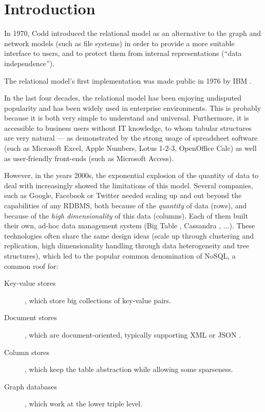 \documentclass{vldb}
\begin{document}
\section{Introduction}
In 1970, Codd \cite{Codd1970} introduced the relational model as an alternative to the graph and network models (such as file systems) in order to provide a more suitable interface to users, and to protect them from internal representations (``data independence'').

The relational model's first implementation was made public in 1976 by IBM \cite{Astrahan1976}.

In the last four decades, the relational model has been enjoying undisputed popularity and has been widely used in enterprise environments. This is probably because it is both very simple to understand and universal. Furthermore, it is accessible to business users without IT knowledge, to whom tabular structures are very natural --- as demonstrated by the strong usage of spreadsheet software \cite{Mattessich1958} \cite{Mattessich1961} (such as Microsoft Excel, Apple Numbers, Lotus 1-2-3, OpenOffice Calc) as well as user-friendly front-ends (such as Microsoft Access).

However, in the years 2000s, the exponential explosion of the quantity of data to deal with increasingly showed the limitations of this model. Several companies, such as Google, Facebook or Twitter needed scaling up and out beyond the capabilities of any RDBMS, both because of the \emph{quantity} of data (rows), and because of the \emph{high dimensionality} of this data (columns). Each of them built their own, ad-hoc data management system (Big Table \cite{Chang2008}, Cassandra \cite{Lakshman2010}, ...). These technologies often share the same design ideas (scale up through clustering and replication, high dimensionality handling through data heterogeneity and tree structures), which led to the popular common denomination of NoSQL, a common roof for:
\begin{description}
\item[Key-value stores], which store big collections of key-value pairs.
\item[Document stores], which are document-oriented, typically supporting XML \cite{XML} or JSON \cite{JSON}.
\item[Column stores], which keep the table abstraction while allowing some sparseness.
\item[Graph databases], which work at the lower triple level.
\end{description}
\end{document}

